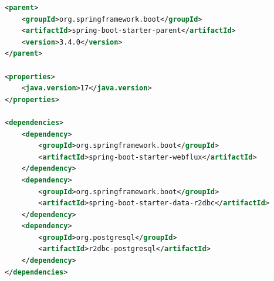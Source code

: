 \begin{lstlisting}[language=xml, caption={Versions Backend Petri Net - pom.xml (extrait)}, label={lst:pom-petri}]
<parent>
    <groupId>org.springframework.boot</groupId>
    <artifactId>spring-boot-starter-parent</artifactId>
    <version>3.4.0</version>
</parent>

<properties>
    <java.version>17</java.version>
</properties>

<dependencies>
    <dependency>
        <groupId>org.springframework.boot</groupId>
        <artifactId>spring-boot-starter-webflux</artifactId>
    </dependency>
    <dependency>
        <groupId>org.springframework.boot</groupId>
        <artifactId>spring-boot-starter-data-r2dbc</artifactId>
    </dependency>
    <dependency>
        <groupId>org.postgresql</groupId>
        <artifactId>r2dbc-postgresql</artifactId>
    </dependency>
</dependencies>
\end{lstlisting}